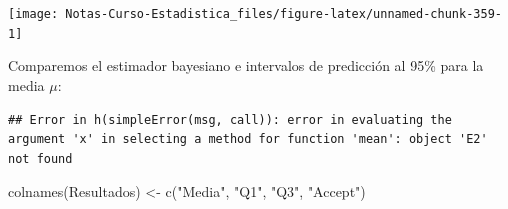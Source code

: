 \documentclass[
  12pt,
]{book}
\newenvironment{Shaded}{\begin{snugshade}}{\end{snugshade}}
\newcommand{\AttributeTok}[1]{\textcolor[rgb]{0.77,0.63,0.00}{#1}}
\newcommand{\ConstantTok}[1]{\textcolor[rgb]{0.00,0.00,0.00}{#1}}
\newcommand{\DecValTok}[1]{\textcolor[rgb]{0.00,0.00,0.81}{#1}}
\newcommand{\FloatTok}[1]{\textcolor[rgb]{0.00,0.00,0.81}{#1}}
\newcommand{\FunctionTok}[1]{\textcolor[rgb]{0.00,0.00,0.00}{#1}}
\newcommand{\NormalTok}[1]{#1}
\newcommand{\OtherTok}[1]{\textcolor[rgb]{0.56,0.35,0.01}{#1}}
\newcommand{\SpecialCharTok}[1]{\textcolor[rgb]{0.00,0.00,0.00}{#1}}
\newcommand{\StringTok}[1]{\textcolor[rgb]{0.31,0.60,0.02}{#1}}
\theoremstyle{definition}
\theoremstyle{definition}
\theoremstyle{definition}
\theoremstyle{definition}
\theoremstyle{remark}
\begin{document}
\begin{center}\texttt{[image: Notas-Curso-Estadistica\_files/figure-latex/unnamed-chunk-359-1]} \end{center}

Comparemos el estimador bayesiano e intervalos de predicción al 95\% para la media \(\mu\):

\begin{Shaded}
\end{Shaded}

\begin{verbatim}
## Error in h(simpleError(msg, call)): error in evaluating the argument 'x' in selecting a method for function 'mean': object 'E2' not found
\end{verbatim}

\begin{Shaded}
\begin{Highlighting}[]
\FunctionTok{colnames}\NormalTok{(Resultados) }\OtherTok{\textless{}{-}} \FunctionTok{c}\NormalTok{(}\StringTok{"Media"}\NormalTok{, }\StringTok{"Q1"}\NormalTok{, }\StringTok{"Q3"}\NormalTok{, }\StringTok{"Accept"}\NormalTok{)}
\end{Highlighting}
\end{Shaded}
\end{document}
